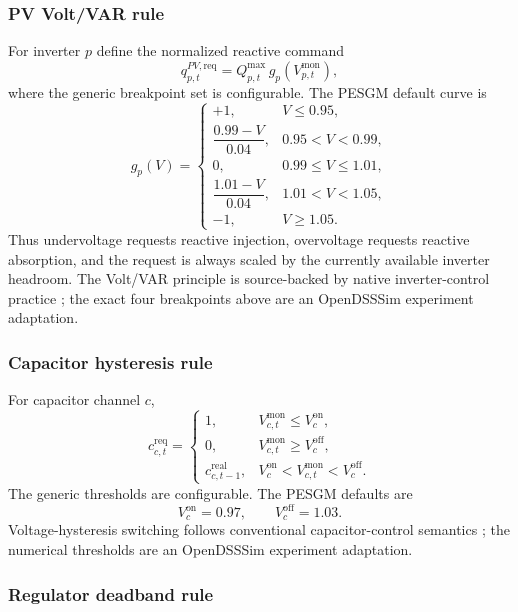 \subsubsection{PV Volt/VAR rule}

For inverter $p$ define the normalized reactive command
\[
q_{p,t}^{PV,\mathrm{req}}
=
Q_{p,t}^{\max}\,
g_p\!\left(
V_{p,t}^{\mathrm{mon}}
\right),
\]
where the generic breakpoint set is configurable.  The PESGM default curve is
\[
g_p(V)
=
\begin{cases}
+1,
&
V\le 0.95,
\\[2mm]
\dfrac{0.99-V}{0.04},
&
0.95<V<0.99,
\\[3mm]
0,
&
0.99\le V\le1.01,
\\[2mm]
\dfrac{1.01-V}{0.04},
&
1.01<V<1.05,
\\[3mm]
-1,
&
V\ge1.05.
\end{cases}
\]
Thus undervoltage requests reactive injection, overvoltage requests reactive absorption,
and the request is always scaled by the currently available inverter headroom.
The Volt/VAR principle is source-backed by native inverter-control practice
\cite{opendss_invcontrol}; the exact four breakpoints above are an OpenDSSSim experiment
adaptation.

\subsubsection{Capacitor hysteresis rule}

For capacitor channel $c$,
\[
c_{c,t}^{\mathrm{req}}
=
\begin{cases}
1,
&
V_{c,t}^{\mathrm{mon}}
\le V_c^{\mathrm{on}},
\\
0,
&
V_{c,t}^{\mathrm{mon}}
\ge V_c^{\mathrm{off}},
\\
c_{c,t-1}^{\mathrm{real}},
&
V_c^{\mathrm{on}}
<
V_{c,t}^{\mathrm{mon}}
<
V_c^{\mathrm{off}}.
\end{cases}
\]
The generic thresholds are configurable.  The PESGM defaults are
\[
\boxed{
V_c^{\mathrm{on}}=0.97,
\qquad
V_c^{\mathrm{off}}=1.03.
}
\]
Voltage-hysteresis switching follows conventional capacitor-control semantics
\cite{opendss_capcontrol}; the numerical thresholds are an OpenDSSSim experiment
adaptation.

\subsubsection{Regulator deadband rule}

